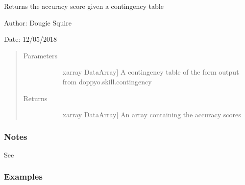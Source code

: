 \documentclass[letterpaper,10pt,english]{sphinxmanual}
\begin{document}
\begin{fulllineitems}
\label{\detokenize{skill_doc:skill.accuracy_score}}
Returns the accuracy score given a contingency table

\begin{DUlineblock}{0em}
\item[] Author: Dougie Squire
\item[] Date: 12/05/2018
\end{DUlineblock}
\begin{quote}\begin{description}
\item[{Parameters}] \leavevmode\begin{description}
\item[{}] \leavevmode{[}xarray DataArray{]}
A contingency table of the form output from doppyo.skill.contingency

\end{description}

\item[{Returns}] \leavevmode\begin{description}
\item[{}] \leavevmode{[}xarray DataArray{]}
An array containing the accuracy scores

\end{description}

\end{description}\end{quote}
\subsubsection*{Notes}

See 
\subsubsection*{Examples}


\end{fulllineitems}
\end{document}
